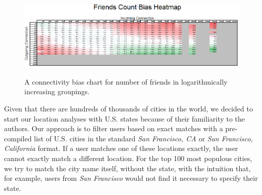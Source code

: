 \begin{figure}[t]
 \centering
 \includegraphics[bb=0 0 746 221,scale=.55]{./images/friends_count.png}
 \label{fig:friend_count}
 \caption{A connectivity bias chart for number of friends in logarithmically increasing groupings.}
\end{figure}


Given that there are hundreds of thousands of cities in the world, we decided to start our location analyses with U.S. states because of their familiarity to the authors.  Our approach is to filter users based on exact matches with a pre-compiled list of U.S. cities in the standard \textit{San Francisco, CA} or \textit{San Francisco, California} format.  If a user matches one of these locations exactly, the user cannot exactly match a different location.  For the top 100 most populous cities, we try to match the city name itself, without the state, with the intuition that, for example, users from \textit{San Francisco} would not find it necessary to specify their state.

